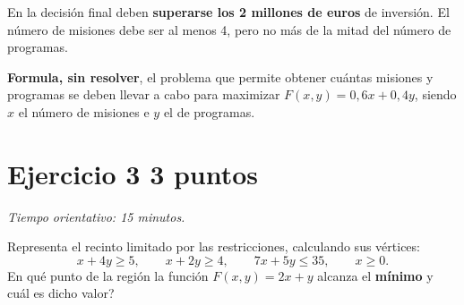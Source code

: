 \documentclass[12pt]{article}
\begin{document}
En la decisión final deben \textbf{superarse los 2 millones de euros} de inversión. El número de misiones debe ser al menos 4, pero no más de la mitad del número de programas.

\textbf{Formula, sin resolver}, el problema que permite obtener cuántas misiones y programas se deben llevar a cabo para maximizar $F(x,y)=0{,}6x+0{,}4y$, siendo $x$ el número de misiones e $y$ el de programas.
\section*{Ejercicio 3 \hfill 3 puntos}
\textit{Tiempo orientativo: 15 minutos.}

Representa el recinto limitado por las restricciones, calculando sus vértices:
\[
x+4y\geq5,\qquad x+2y\geq4,\qquad7x+5y\leq35,\qquad x\geq0.
\]
\textquestiondown{}En qué punto de la región la función $F(x,y)=2x+y$ alcanza el \textbf{mínimo} y cuál es dicho valor?
\end{document}
